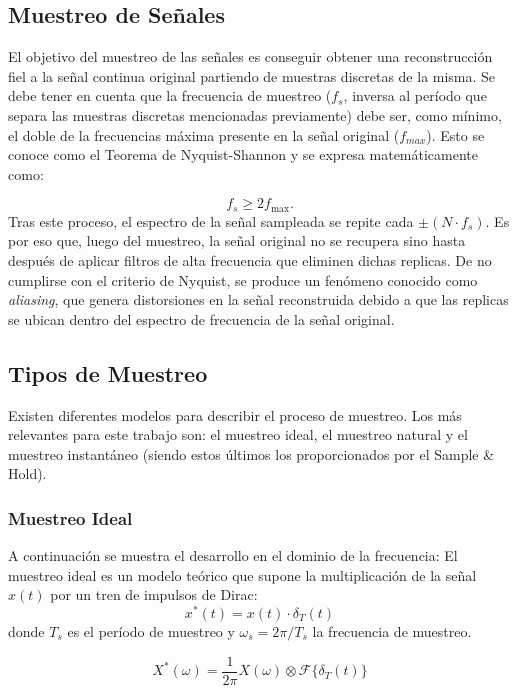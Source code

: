 \subsection{Muestreo de Señales}
El objetivo del muestreo de las señales es conseguir obtener una reconstrucción fiel a la señal continua original partiendo de muestras discretas de la misma.
Se debe tener en cuenta que la frecuencia de muestreo ($f_s$, inversa al período que separa las muestras discretas mencionadas previamente) debe ser, como mínimo, el doble de la frecuencias máxima presente en la señal original ($f_{max}$). Esto se conoce como el Teorema de Nyquist-Shannon y se expresa matemáticamente como:

\begin{equation}
    f_s \geq 2 f_{\max}.
    \label{Nyquist}
\end{equation}
Tras este proceso, el espectro de la señal sampleada se repite cada $\pm (N\cdot f_s)$. Es por eso que, luego del muestreo, la señal original no se recupera sino hasta después de aplicar filtros de alta frecuencia que eliminen dichas replicas.
De no cumplirse con el criterio de Nyquist, se produce un fenómeno conocido como \textit{aliasing}, que genera distorsiones en la señal reconstruida debido a que las replicas se ubican dentro del espectro de frecuencia de la señal original.

\subsection{Tipos de Muestreo}
Existen diferentes modelos para describir el proceso de muestreo. Los más relevantes para este trabajo son: el muestreo ideal, el muestreo natural y el muestreo instantáneo (siendo estos últimos los proporcionados por el Sample \& Hold).

\subsubsection{Muestreo Ideal}

A continuación se muestra el desarrollo en el dominio de la frecuencia:
El muestreo ideal es un modelo teórico que supone la multiplicación de la señal $x(t)$ por un tren de
impulsos de Dirac:
\begin{equation}
    x^*(t) = x(t) \cdot \delta_T(t)
\end{equation}
donde $T_s$ es el período de muestreo y $\omega_s = 2\pi/T_s$ la frecuencia de muestreo. 

\begin{equation}
    X^*(\omega) = \frac{1}{2\pi} X(\omega) \otimes \mathcal{F}\{\delta_T(t)\}
\end{equation}

